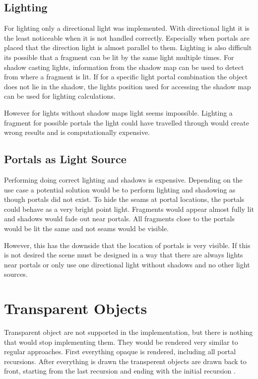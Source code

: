 \subsection{Lighting}
For lighting only a directional light was implemented. With directional light it is the least noticeable when it is not handled correctly. Especially when portals are placed that the direction light is almost parallel to them.
Lighting is also difficult its possible that a fragment can be lit by the same light multiple times. For shadow casting lights, information from the shadow map can be used to detect from where a fragment is lit. If for a specific light portal combination the object does not lie in the shadow, the lights position used for accessing the shadow map can be used for lighting calculations.

However for lights without shadow maps light seems impossible. Lighting a fragment for possible portals the light could have travelled through would create wrong results and is computationally expensive. 


\subsection{Portals as Light Source}
\label{section:portalsaslights}
Performing doing correct lighting and shadows is expensive. Depending on the use case a potential solution would be to perform lighting and shadowing as though portals did not exist. To hide the seams at portal locations, the portals could behave as a very bright point light. Fragments would appear almost fully lit and shadows would fade out near portals. All fragments close to the portals would be lit the same and not seams would be visible.

However, this has the downside that the location of portals is very visible. If this is not desired the scene must be designed in a way that there are always lights near portals or only use one directional light without shadows and no other light sources.


\section{Transparent Objects}
Transparent object are not supported in the implementation, but there is nothing that would stop implementing them. They would be rendered very similar to regular approaches. First everything opaque is rendered, including all portal recursions. After everything is drawn the transperent objects are drawn back to front, starting from the last recursion and ending with the initial recursion \cite{lecture:portalProblems}.

